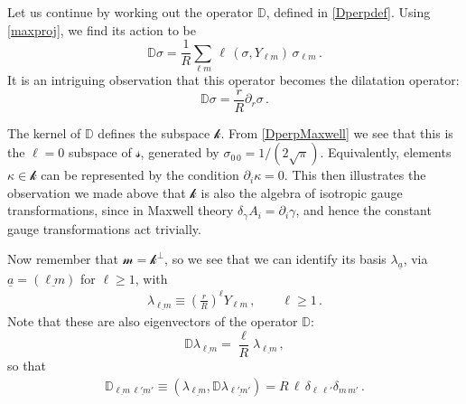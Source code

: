 \documentclass[11pt,a4paper]{article}
\def\calsk{\boldsymbol{\mathscr k}}
\def\calsm{{\boldsymbol{\mathscr m}}}
\def\calss{{\boldsymbol{\mathscr s}}}
\def\ua{{\underline{a}}}
\def\ulm{{\underline{\ell m}}}
\def\ulmp{{\underline{\ell'm'}}}
\def\Dperp{{\mathbb{D}}}
\begin{document}
          	Let us continue by working out the operator $\Dperp$, defined in \eqref{Dperpdef}.
            Using \eqref{maxproj}, we find its action to be
          	\begin{equation}
          	\Dperp\sigma=\frac{1}{R}\sum_{\ell m}\,\ell\,(\sigma,Y_{\ell m})\,\sigma_{\ell m}\label{DperpMaxwell}\,.
          	\end{equation}
          	 It is an intriguing observation that this operator becomes the dilatation operator:
          	 \begin{equation}
          	 \Dperp\sigma=\frac{r}{R}\partial_r \sigma\,.
          	 \end{equation}

          	The kernel of $\Dperp$ defines the subspace $\calsk$. From \eqref{DperpMaxwell} we see that this is the $\ell=0$ subspace of $\calss$, generated by $\sigma_{0\,0}=1/(2\sqrt{\pi})$. Equivalently, elements $\kappa\in\calsk$ can be represented by the condition $\partial_i\kappa=0$. This then illustrates the observation we made above that $\calsk$ is also the algebra of isotropic gauge transformations, since in Maxwell theory $\delta_\gamma A_i=\partial_i\gamma$, and hence the constant gauge transformations act trivially.
          	
          	Now remember that $\calsm=\calsk^\perp$, so we see that we can identify its basis $\lambda_{\ua}$, via $\ua=(\ulm)$ for $\ell\geq 1$, with          	     	
          	\begin{align}
            \lambda_{\ulm}\equiv\left(\frac{r}{R}\right)^\ell Y_{\ell m}\,,\qquad \ell\geq 1\,.
          	\end{align}
          	Note that these are also eigenvectors of the operator $\Dperp$:
          	\begin{equation}
          	\Dperp \lambda_{\ulm}=\frac{\ell}{R}\lambda_{\ulm}\,,
          	\end{equation}
          	so that
          	\begin{eqnarray}
          	\Dperp_{\ulm\,\ulmp}\equiv(\lambda_{\ulm},\Dperp\lambda_{\ulmp})=R\,\ell\,\delta_{\ell\,\ell'}\delta_{m\,m'}\,.\label{MDmat}
          	\end{eqnarray}
          	
\end{document}
